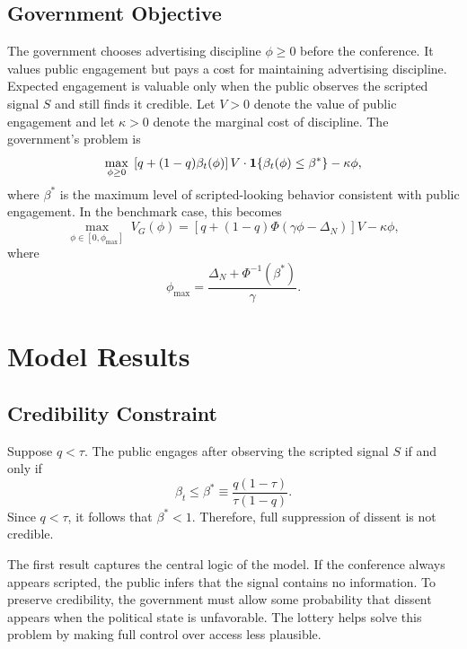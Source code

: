 \subsection{Government Objective}

The government chooses advertising discipline $\phi\geq 0$ before the conference. It values public engagement but pays a cost for maintaining advertising discipline. Expected engagement is valuable only when the public observes the scripted signal $S$ and still finds it credible. Let $V>0$ denote the value of public engagement and let $\kappa>0$ denote the marginal cost of discipline. The government's problem is
\begin{equation}
    \max_{\phi \geq 0} \; \left[q+(1-q)\beta_t(\phi)\right]V \cdot \mathbf{1}\{\beta_t(\phi)\leq \beta^*\}-\kappa\phi,
\end{equation}
where $\beta^*$ is the maximum level of scripted-looking behavior consistent with public engagement. In the benchmark case, this becomes
\begin{equation}
    \max_{\phi \in [0,\phi_{\max}]} \; V_G(\phi)=\left[q+(1-q)\Phi(\gamma\phi-\Delta_N)\right]V-\kappa\phi,
\end{equation}
where
\begin{equation}
    \phi_{\max}=\frac{\Delta_N+\Phi^{-1}(\beta^*)}{\gamma}.
\end{equation}

\section{Model Results}

\subsection{Credibility Constraint}

\begin{proposition}
Suppose $q<\tau$. The public engages after observing the scripted signal $S$ if and only if
\begin{equation}
    \beta_t \leq \beta^* \equiv \frac{q(1-\tau)}{\tau(1-q)}.
\end{equation}
Since $q<\tau$, it follows that $\beta^*<1$. Therefore, full suppression of dissent is not credible.
\end{proposition}

The first result captures the central logic of the model. If the conference always appears scripted, the public infers that the signal contains no information. To preserve credibility, the government must allow some probability that dissent appears when the political state is unfavorable. The lottery helps solve this problem by making full control over access less plausible.

